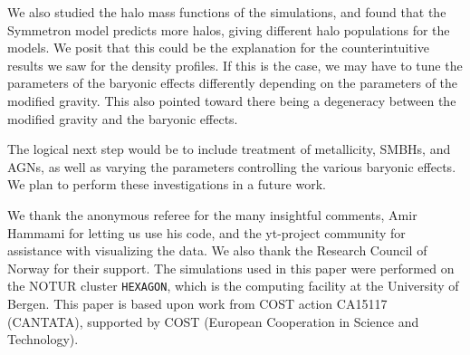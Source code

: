 \documentclass{aa}
\begin{document}
We also studied the halo mass functions of the simulations, and found that the Symmetron model predicts more halos, giving different halo populations for the models. We posit that this could be the explanation for the counterintuitive results we saw for the density profiles. If this is the case, we may have to tune the parameters of the baryonic effects differently depending on the parameters of the modified gravity. This also pointed toward there being a degeneracy between the modified gravity and the baryonic effects.

The logical next step would be to include treatment of metallicity, SMBHs, and AGNs, as well as varying the parameters controlling the various baryonic effects. We plan to perform these investigations in a future work.

\begin{acknowledgements}
We thank the anonymous referee for the many insightful comments, Amir Hammami for letting us use his code, and the yt-project community for assistance with visualizing the data. We also thank the Research Council of Norway for their support. The simulations used in this paper were performed on the NOTUR cluster {\tt{HEXAGON}}, which is the computing facility at the University of Bergen. This paper is based upon work from COST action CA15117 (CANTATA), supported by COST (European Cooperation in Science and Technology). 
\end{acknowledgements}








\end{document}
